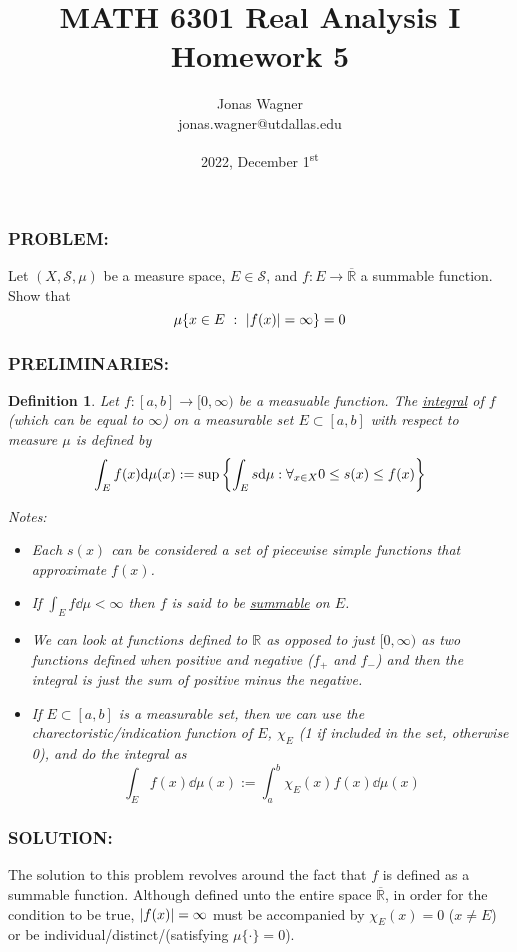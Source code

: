 \documentclass[]{article}
\title{MATH 6301 Real Analysis I \\ Homework 5}
\author{Jonas Wagner\\ jonas.wagner@utdallas.edu}
\date{2022, December 1\textsuperscript{st}}
\newcommand{\Problem}{\subsubsection*{\textbf{PROBLEM:}}}
\newcommand{\Solution}{\subsubsection*{\textbf{SOLUTION:}}}
\newcommand{\Preliminaries}{\subsubsection*{\textbf{PRELIMINARIES:}}}
\newcommand{\R}{\mathbb{R}}
\newcommand{\SigAlg}{\mathcal{S}}
\newcommand{\st}{\ : \ }
\newtheorem{definition}{Definition}
\begin{document}
\maketitle

\tableofcontents



\newpage
\section{}
\Problem
Let $(X, \SigAlg,\mu)$ be a measure space, $E \in \SigAlg$, and $f : E \to \overline{\R}$ a summable function.                                                                                          
Show that \[
\mu\{x \in E \st \abs{f(x)} = \infty\} = 0
\]

\Preliminaries
\begin{definition}
    Let $f : [a,b] \to [0,\infty)$ be a measuable function.
    The \emph{\underline{integral}} of $f$ (which can be equal to $\infty$) on a measurable set $E \subset [a,b]$ with respect to measure $\mu$ is defined by \[
        \int_{E} f(x) \dd \mu(x) := \sup\qty{
            \int_{E} s \dd \mu : \forall_{x \in X} 0 \leq s(x) \leq f(x)
        }
    \] 
    
    Notes: 
    \begin{itemize}
        \item Each $s(x)$ can be considered a set of piecewise simple functions that approximate $f(x)$.
        \item If $\int_{E} f \dd \mu < \infty$ then $f$ is said to be \emph{\underline{summable}} on $E$.
        \item We can look at functions defined to $\R$ as opposed to just $[0,\infty)$ as two functions defined when positive and negative ($f_{+}$ and $f_{-}$) and then the integral is just the sum of positive minus the negative.
        \item If $E \subset [a,b]$ is a measurable set, then we can use the charectoristic/indication function of $E$, $\chi_E$ (1 if included in the set, otherwise 0), and do the integral as \[
            \int_{E} f(x) \dd \mu(x) := \int_{a}^{b} \chi_{E}(x) f(x) \dd \mu(x)
        \]
    \end{itemize}    
\end{definition}

\Solution

The solution to this problem revolves around the fact that $f$ is defined as a summable function. 
Although defined unto the entire space $\overline{\R}$, in order for the condition to be true, $\abs{f(x)} = \infty$ must be accompanied by $\chi_E(x) = 0$ ($x \neq E$) or be individual/distinct/(satisfying $\mu\{\cdot\} = 0$).
\end{document}
